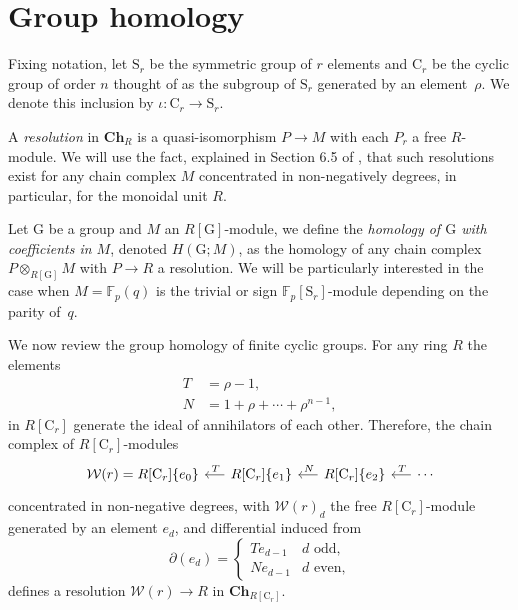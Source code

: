 
\section{Group homology} \label{s:goup homology}

Fixing notation, let $\mathrm{S}_r$ be the symmetric group of $r$ elements and $\mathrm{C}_r$ be the cyclic group of order $n$ thought of as the subgroup of $\mathrm{S}_r$ generated by an element~$\rho$.
We denote this inclusion by $\iota \colon \mathrm C_r \to \mathrm S_r$.

A \textit{resolution} in $\mathbf{Ch}_R$ is a quasi-isomorphism $P \to M$ with each $P_r$ a free $R$-module.
We will use the fact, explained in Section 6.5 of \cite{jacobson1989algebra}, that such resolutions exist for any chain complex $M$ concentrated in non-negatively degrees, in particular, for the monoidal unit $R$.

Let $\mathrm G$ be a group and $M$ an $R[\mathrm G]$-module, we define the \textit{homology of $\mathrm G$ with coefficients in $M$}, denoted $H(\mathrm G; M)$, as the homology of any chain complex $P \otimes_{R[\mathrm G]} M$ with $P \to R$ a resolution.
We will be particularly interested in the case when $M = \mathbb F_p(q)$ is the trivial or sign $\mathbb F_p[\mathrm{S}_r]$-module depending on the parity of~$q$.

We now review the group homology of finite cyclic groups.
For any ring $R$ the elements
\begin{equation} \label{eq: T and R definition}
\begin{split}
T &= \rho - 1, \\
N &= 1 + \rho + \cdots + \rho^{n-1},
\end{split}
\end{equation}
in $R[\mathrm{C}_r]$ generate the ideal of annihilators of each other.
Therefore, the chain complex of $R[\mathrm{C}_r]$-modules
\begin{equation} \label{eq: minimal resolution}
\begin{tikzcd} [column sep = .5cm]
\mathcal W(r) = R[\mathrm{C}_r]\{e_0\} & \arrow[l, "\,T"'] R[\mathrm{C}_r]\{e_1\} & \arrow[l, "\,N"'] R[\mathrm{C}_r]\{e_2\} & \arrow[l, "\,T"'] \cdots
\end{tikzcd}
\end{equation}
concentrated in non-negative degrees, with $\mathcal W(r)_d$ the free $R[\mathrm{C}_r]$-module generated by an element $e_d$, and differential induced from
\begin{equation*}
\partial(e_d) = \begin{cases}
Te_{d-1} & d \text{ odd,} \\
Ne_{d-1} & d \text{ even,}
\end{cases}
\end{equation*}
defines a resolution $\mathcal W(r) \to R$ in $\mathbf{Ch}_{R[\mathrm{C}_r]}$.

